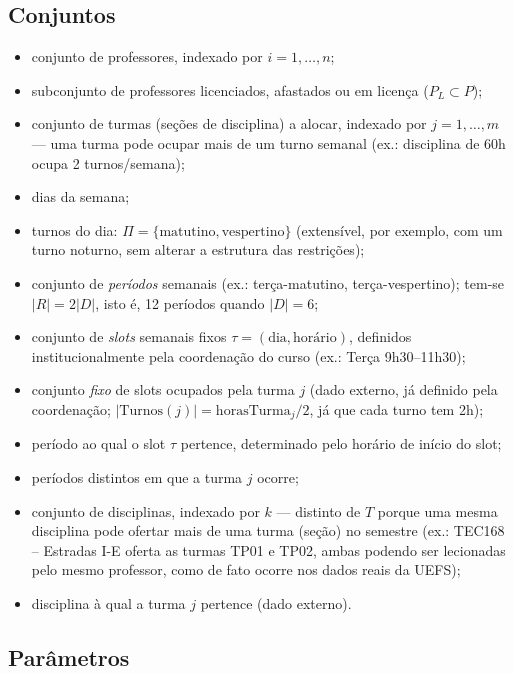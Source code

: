 \documentclass[11pt,a4paper]{article}
\begin{document}
\subsection{Conjuntos}
\begin{itemize}[leftmargin=2.2cm]
  \item[$P$] conjunto de professores, indexado por $i = 1, \dots, n$;
  \item[$P_L$] subconjunto de professores licenciados, afastados ou em licença ($P_L \subset P$);
  \item[$T$] conjunto de turmas (seções de disciplina) a alocar, indexado por $j = 1, \dots, m$ --- uma turma pode ocupar mais de um turno semanal (ex.: disciplina de 60h ocupa 2 turnos/semana);
  \item[$D$] dias da semana;
  \item[$\Pi$] turnos do dia: $\Pi=\{\text{matutino},\text{vespertino}\}$ (extensível, por exemplo, com um turno noturno, sem alterar a estrutura das restrições);
  \item[$R = D\times\Pi$] conjunto de \emph{períodos} semanais (ex.: terça-matutino, terça-vespertino); tem-se $|R|=2|D|$, isto é, 12 períodos quando $|D|=6$;
  \item[$\Sigma$] conjunto de \emph{slots} semanais fixos $\tau=(\text{dia},\text{horário})$, definidos institucionalmente pela coordenação do curso (ex.: Terça 9h30--11h30);
  \item[$\text{Turnos}(j) \subseteq \Sigma$] conjunto \emph{fixo} de slots ocupados pela turma $j$ (dado externo, já definido pela coordenação; $|\text{Turnos}(j)| = \mathrm{horasTurma}_{j}/2$, já que cada turno tem 2h);
  \item[$\text{per}(\tau)\in R$] período ao qual o slot $\tau$ pertence, determinado pelo horário de início do slot;
  \item[$\text{Periodos}(j) = \{\text{per}(\tau) : \tau\in\text{Turnos}(j)\}\subseteq R$] períodos distintos em que a turma $j$ ocorre;
  \item[$K$] conjunto de disciplinas, indexado por $k$ --- distinto de $T$ porque uma mesma disciplina pode ofertar mais de uma turma (seção) no semestre (ex.: TEC168 -- Estradas I-E oferta as turmas TP01 e TP02, ambas podendo ser lecionadas pelo mesmo professor, como de fato ocorre nos dados reais da UEFS);
  \item[$\text{Disc}(j) \in K$] disciplina à qual a turma $j$ pertence (dado externo).
\end{itemize}

\subsection{Parâmetros}
\end{document}
